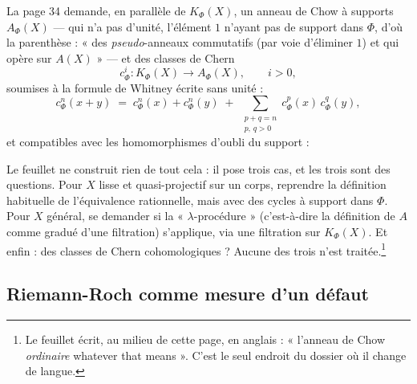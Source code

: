 \documentclass[11pt,a4paper]{article}
\begin{document}
La page 34 demande, en parallèle de $K_{\Phi}(X)$, un anneau de Chow à supports
$A_{\Phi}(X)$ --- qui n'a pas d'unité, l'élément $1$ n'ayant pas de support
dans $\Phi$, d'où la parenthèse : « des \emph{pseudo}-anneaux commutatifs (par
voie d'éliminer $1$) et qui opère sur $A(X)$ » --- et des classes de Chern
\[
  c^{i}_{\Phi} : K_{\Phi}(X) \longrightarrow A_{\Phi}(X), \qquad i > 0,
\]
soumises à la formule de Whitney écrite sans unité :
\[
  c^{n}_{\Phi}(x+y) \;=\; c^{n}_{\Phi}(x) + c^{n}_{\Phi}(y)
  \;+\; \sum_{\substack{p+q=n \\ p,\,q > 0}} c^{p}_{\Phi}(x)\,c^{q}_{\Phi}(y),
\]
et compatibles avec les homomorphismes d'oubli du support :


Le feuillet ne construit rien de tout cela : il pose trois cas, et les trois
sont des questions. Pour $X$ lisse et quasi-projectif sur un corps, reprendre
la définition habituelle de l'équivalence rationnelle, mais avec des cycles à
support dans $\Phi$.
Pour $X$ général, se demander si la « $\lambda$-procédure » (c'est-à-dire la
définition de $A$ comme gradué d'une filtration) s'applique, via une
filtration sur $K_{\Phi}(X)$. Et enfin : des classes de Chern cohomologiques ? Aucune des
trois n'est traitée.\footnote{Le feuillet écrit, au milieu de cette page, en
anglais : « l'anneau de Chow \emph{ordinaire} whatever that means ». C'est le
seul endroit du dossier où il change de langue.}

\subsection*{Riemann-Roch comme mesure d'un défaut}
\end{document}
